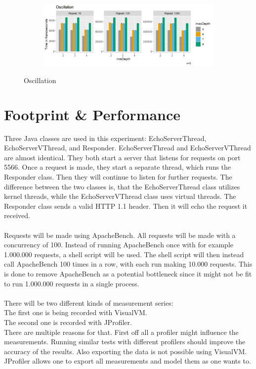 \begin{figure}[H]
  \centering
  \begin{subfigure}[b]{1.0\textwidth}
    \includegraphics[width=1.0\linewidth]{img/jmh/Oscillation.png}
  \end{subfigure}
  \caption{Oscillation}
\end{figure}




\section{Footprint \& Performance}

Three Java classes are used in this experiment: EchoServerThread, EchoServerVThread, and Responder.
EchoServerThread and EchoServerVThread are almost identical. They both start a server that listens for requests on port 5566. Once a request is made, they start a separate thread, which runs the Responder class. Then they will continue to listen for further requests. The difference between the two classes is, that the EchoServerThread class utilizes kernel threads, while the EchoServerVThread class uses virtual threads. The Responder class sends a valid HTTP 1.1 header. Then it will echo the request it received.
\\
\\
Requests will be made using ApacheBench. All requests will be made with a concurrency of 100. Instead of running ApacheBench once with for example 1.000.000 requests, a shell script will be used. The shell script will then instead call ApacheBench 100 times in a row, with each run making 10.000 requests. This is done to remove ApacheBench as a potential bottleneck since it might not be fit to run 1.000.000 requests in a single process.
\\
\\
There will be two different kinds of measurement series:
\\
The first one is being recorded with VisualVM.
\\
The second one is recorded with JProfiler.
\\
There are multiple reasons for that. First off all a profiler might influence the measurements. Running similar tests with different profilers should improve the accuracy of the results. Also exporting the data is not possible using VisualVM. JProfiler allows one to export all measurements and model them as one wants to.

